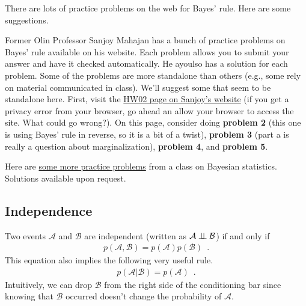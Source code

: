 \documentclass{tufte-handout}
\begin{document}
\begin{exercise}
There are lots of practice problems on the web for Bayes' rule.  Here are some suggestions.
\bes
\item Former Olin Professor Sanjoy Mahajan has a bunch of practice problems on Bayes' rule available on his website.  Each problem allows you to submit your answer and have it checked automatically.  He ayoulso has a solution for each problem.  Some of the problems are more standalone than others (e.g., some rely on material communicated in class).  We'll suggest some that seem to be standalone here.  First, visit the \href{https://tutor.sanjoymahajan.org/bayes/hw02}{HW02 page on Sanjoy's website} (if you get a privacy error from your browser, go ahead an allow your browser to access the site.  What could go wrong?).  On this page, consider doing \textbf{problem 2} (this one is using Bayes' rule in reverse, so it is a bit of a twist), \textbf{problem 3} (part a is really a question about marginalization), \textbf{problem 4}, and \textbf{problem 5}.
\item Here are \href{http://www2.stat.duke.edu/~jerry/sta101/extraproblems/bayesian.htm}{some more practice problems} from a class on Bayesian statistics.  Solutions available upon request.
\ees
\end{exercise}


\subsection{Independence}

Two events $\mathcal{A}$ and $\mathcal{B}$ are independent (written as $\mathcal{A} \perp\!\!\!\perp \mathcal{B}$) if and only if
\begin{align}
p(\mathcal{A}, \mathcal{B}) = p(\mathcal{A}) p(\mathcal{B}) \enspace .
\end{align}
This equation also implies the following very useful rule.
\begin{align}
p(\mathcal{A} | \mathcal{B}) = p(\mathcal{A}) \enspace .
\end{align}
Intuitively, we can drop $\mathcal{B}$ from the right side of the conditioning bar since knowing that $\mathcal{B}$ occurred doesn't change the probability of $\mathcal{A}$.
\end{document}
